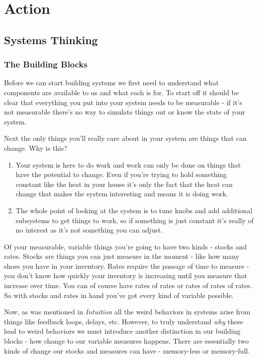 \documentclass[11pt,a5paper]{book}
\begin{document}
\part{Action}

\chapter{Systems Thinking}
\section{The Building Blocks}
Before we can start building systems we first need to understand what components are available to us and what each is for. To start off it should be clear that everything you put into your system needs to be measurable - if it's not measurable there's no way to simulate things out or know the state of your system. 
\newline

Next the only things you'll really care about in your system are things that can change. Why is this?

\begin{enumerate}
\item Your system is here to do work and work can only be done on things that have the potential to change. Even if you're trying to hold something constant like the heat in your house it's only the fact that the heat can change that makes the system interesting and means it is doing work.
\item The whole point of looking at the system is to tune knobs and add additional subsystems to get things to work, so if something is just constant it's really of no interest as it's not something you can adjust. 
\end{enumerate}

Of your measurable, variable things you're going to have two kinds - stocks and rates. Stocks are things you can just measure in the moment - like how many shoes you have in your inventory. Rates require the passage of time to measure - you don't know how quickly your inventory is increasing until you measure that increase over time. You can of course have rates of rates or rates of rates of rates. So with stocks and rates in hand you've got every kind of variable possible.
\newline

Now, as was mentioned in \textit{Intuition} all the weird behaviors in systems arise from things like feedback loops, delays, etc. However, to truly understand \textit{why} these lead to weird behaviors we must introduce another distinction in our building blocks - how change to our variable measures happens. There are essentially two kinds of change our stocks and measures can have - memory-less or memory-full. 
\newline
\end{document}
